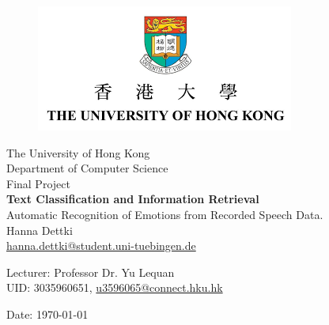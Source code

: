 \documentclass[11pt,a4paper,twoside]{article}
\theoremstyle{thmbreak}
\numberwithin{Theorem}{subsection}
\theoremstyle{defbreak}
\theoremstyle{remark}
\theoremstyle{remark}
\begin{document}
\pagestyle{empty}


\begin{titlepage}

	\begin{figure}
		\begin{center}
			\includegraphics[scale=.7]{img/hku-logo.png} %
		\end{center}
	\end{figure}




\begin{center}
  {\LARGE The University of Hong Kong}\\
  {\large Department of Computer Science\\
   
    \vspace*{2cm}
  {\huge Final Project\\[1.5cm]}}
    {\Large\bf Text Classification and Information Retrieval}\\ [0.2cm]
    {\large   Automatic Recognition of Emotions from Recorded Speech Data.\\[1.5cm]}
  {\large Hanna Dettki}\\
  \href{mailto:hanna.dettki@student.uni-tuebingen.de}{hanna.dettki@student.uni-tuebingen.de}



\end{center}

\vfill
Lecturer: Professor Dr. Yu Lequan\\


UID: 3035960651, 
\href{mailto:u3596065@connect.hku.hk}{u3596065@connect.hku.hk}

Date: \today

\end{titlepage}
\end{document}
